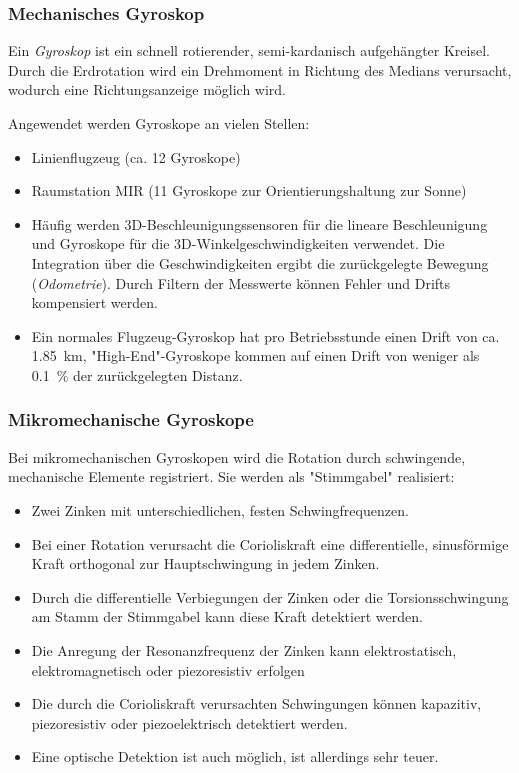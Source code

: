 			\subsubsection{Mechanisches Gyroskop}
				Ein \emph{Gyroskop} ist ein schnell rotierender, semi-kardanisch aufgehängter Kreisel. Durch die Erdrotation wird ein Drehmoment in Richtung des Medians verursacht, wodurch eine Richtungsanzeige möglich wird.
				
				Angewendet werden Gyroskope an vielen Stellen:
				\begin{itemize}
					\item Linienflugzeug (ca. \num{12} Gyroskope)
					\item Raumstation MIR (\num{11} Gyroskope zur Orientierungshaltung zur Sonne)
					\item Häufig werden 3D-Beschleunigungssensoren für die lineare Beschleunigung und Gyroskope für die 3D-Winkelgeschwindigkeiten verwendet. Die Integration über die Geschwindigkeiten ergibt die zurückgelegte Bewegung (\emph{Odometrie}). Durch Filtern der Messwerte können Fehler und Drifts kompensiert werden.
					\item Ein normales Flugzeug-Gyroskop hat pro Betriebsstunde einen Drift von ca. \SI{1.85}{\kilo\meter}, "High-End"-Gyroskope kommen auf einen Drift von weniger als \SI{0.1}{\percent} der zurückgelegten Distanz.
				\end{itemize}

			\subsubsection{Mikromechanische Gyroskope}
				Bei mikromechanischen Gyroskopen wird die Rotation durch schwingende, mechanische Elemente registriert. Sie werden \zB als "Stimmgabel" realisiert:
				\begin{itemize}
					\item Zwei Zinken mit unterschiedlichen, festen Schwingfrequenzen.
					\item Bei einer Rotation verursacht die Corioliskraft eine differentielle, sinusförmige Kraft orthogonal zur Hauptschwingung in jedem Zinken.
					\item Durch die differentielle Verbiegungen der Zinken oder die Torsionsschwingung am Stamm der Stimmgabel kann diese Kraft detektiert werden.
					\item Die Anregung der Resonanzfrequenz der Zinken kann elektrostatisch, elektromagnetisch oder piezoresistiv erfolgen
					\item Die durch die Corioliskraft verursachten Schwingungen können kapazitiv, piezoresistiv oder piezoelektrisch detektiert werden.
					\item Eine optische Detektion ist auch möglich, ist \iA allerdings sehr teuer.
				\end{itemize}

